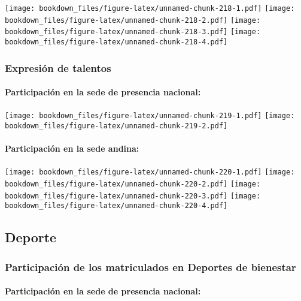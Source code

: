 \documentclass[]{article}
\let\oldparagraph\paragraph
\renewcommand{\paragraph}[1]{\oldparagraph{#1}\mbox{}}
\theoremstyle{definition}
\theoremstyle{definition}
\theoremstyle{definition}
\theoremstyle{remark}
\begin{document}
\texttt{[image: bookdown\_files/figure-latex/unnamed-chunk-218-1.pdf]}
\texttt{[image: bookdown\_files/figure-latex/unnamed-chunk-218-2.pdf]}
\texttt{[image: bookdown\_files/figure-latex/unnamed-chunk-218-3.pdf]}
\texttt{[image: bookdown\_files/figure-latex/unnamed-chunk-218-4.pdf]}

\subsubsection{Expresión de talentos}\label{expresion-de-talentos-1}

\paragraph{Participación en la sede de presencia
nacional:}\label{participacion-en-la-sede-de-presencia-nacional-26}

\texttt{[image: bookdown\_files/figure-latex/unnamed-chunk-219-1.pdf]}
\texttt{[image: bookdown\_files/figure-latex/unnamed-chunk-219-2.pdf]}

\paragraph{Participación en la sede
andina:}\label{participacion-en-la-sede-andina-26}

\texttt{[image: bookdown\_files/figure-latex/unnamed-chunk-220-1.pdf]}
\texttt{[image: bookdown\_files/figure-latex/unnamed-chunk-220-2.pdf]}
\texttt{[image: bookdown\_files/figure-latex/unnamed-chunk-220-3.pdf]}
\texttt{[image: bookdown\_files/figure-latex/unnamed-chunk-220-4.pdf]}

\subsection{Deporte}\label{deporte-1}

\subsubsection{Participación de los matriculados en Deportes de
bienestar}\label{participacion-de-los-matriculados-en-deportes-de-bienestar-1}

\paragraph{Participación en la sede de presencia
nacional:}\label{participacion-en-la-sede-de-presencia-nacional-27}
\end{document}

